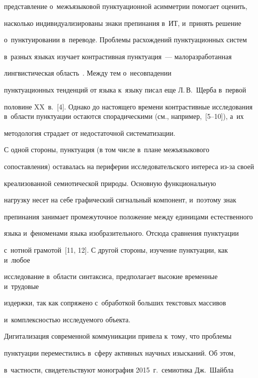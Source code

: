 представление о~межъязыковой пунктуационной асимметрии помогает оценить, 


насколько индивидуализированы знаки препинания в~ИТ, и~принять решение 


о~пунктуировании в~переводе. Проблемы расхождений пунктуационных сис\-тем 


в~разных языках изучает контрастивная пунктуация~--- малоразработанная 


лингвистическая область~\cite[с.~75--84]{3-nur}. Между тем о~несовпадении 


пунктуационных тенденций от языка к~языку писал еще Л.\,В.~Щерба в~первой 


половине XX~в.~[4]. Однако до настоящего времени контрастивные исследования в~области пунктуации остаются спорадическими (см., например,~[5--10]), а~их 


методология страдает от недостаточной систематизации.


  


  С одной стороны, пунктуация (в том числе в~плане межъязыкового 


сопоставления) оставалась на периферии исследовательского интереса из-за своей 


креализованной семиотической природы. Основную функциональную 


нагрузку несет на себе графический сигнальный компонент, и~поэтому знак 


препинания занимает промежуточное положение между единицами естественного 


языка и~феноменами языка изобразительного. Отсюда сравнения пунктуации 


с~нотной грамотой~[11, 12]. С другой стороны, изучение пунктуации, как и~любое 


исследование в~области синтаксиса, предполагает высокие временные и~трудовые 


издержки, так как сопряжено с~обработкой больших текстовых массивов 


и~комплексностью исследуемого объекта.


  


  Дигитализация современной коммуникации привела к~тому, что проблемы 


пунктуации переместились в~сферу активных научных изысканий. Об этом, 


в~частности, свидетельствуют монография 2015~г.\ семиотика Дж.~Шайб\-ла 


